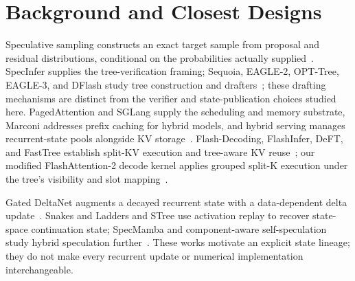 \documentclass[sigconf,anonymous,review]{acmart}
\begin{document}
\section{Background and Closest Designs}
\label{sec:related}
Speculative sampling constructs an exact target sample from proposal and residual distributions, conditional on the probabilities actually supplied~\cite{leviathan2023fast,chen2023sampling}. SpecInfer supplies the tree-verification framing; Sequoia, EAGLE-2, OPT-Tree, EAGLE-3, and DFlash study tree construction and drafters~\cite{miao2023specinfer,chen2024sequoia,li2024eagle,wang2024opt,li2025eagle3,chen2026dflash}; these drafting mechanisms are distinct from the verifier and state-publication choices studied here. PagedAttention and SGLang supply the scheduling and memory substrate, Marconi addresses prefix caching for hybrid models, and hybrid serving manages recurrent-state pools alongside KV storage~\cite{kwon2023efficient,zheng2024sglang,pan2024marconi,pytorch2025sglang,sglang2026qwen}. Flash-Decoding, FlashInfer, DeFT, and FastTree establish split-KV execution and tree-aware KV reuse~\cite{dao2023flashdecoding,ye2025flashinfer,yao2024deft,pan2025fasttree}; our modified FlashAttention-2 decode kernel applies grouped split-K execution under the tree's visibility and slot mapping~\cite{dao2023flashattention}.

Gated DeltaNet augments a decayed recurrent state with a data-dependent delta update~\cite{yang2024gated,yang2024delta}. Snakes and Ladders and STree use activation replay to recover state-space continuation state; SpecMamba and component-aware self-speculation study hybrid speculation further~\cite{wu2024snakes,wu2025stree,zhong2025specmamba,borobia2026component}. These works motivate an explicit state lineage; they do not make every recurrent update or numerical implementation interchangeable.
\end{document}
